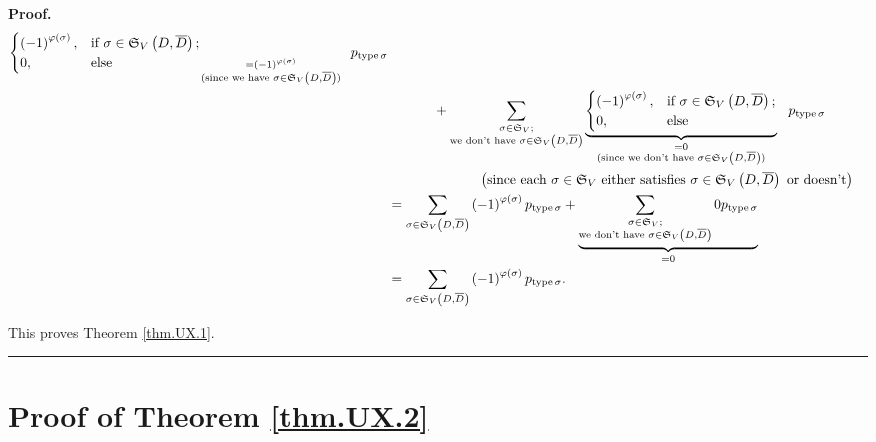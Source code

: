 \documentclass[numbers=enddot,12pt,final,onecolumn,notitlepage]{scrartcl}%
\numberwithin{exer}{section}
\theoremstyle{definition}
\newenvironment{proof}[1][Proof]{\noindent\textbf{#1.} }{\ \rule{0.5em}{0.5em}}
\let\sumnonlimits\sum
\renewcommand{\sum}{\sumnonlimits\limits}
\newenvironment{verlong}{}{}
\newenvironment{vershort}{}{}
\begin{document}
\begin{proof}
\begin{verlong}
\begin{align*}
{\begin{cases}
\left(  -1\right)  ^{\varphi\left(  \sigma\right)  }, & \text{if }\sigma
\in\mathfrak{S}_{V}\left(  D,\overline{D}\right)  ;\\
0, & \text{else}%
\end{cases}
}_{\substack{=\left(  -1\right)  ^{\varphi\left(  \sigma\right)
}\\\text{(since we have }\sigma\in\mathfrak{S}_{V}\left(  D,\overline
{D}\right)  \text{)}}}\ \ p_{\operatorname*{type}\sigma}\\
&  \ \ \ \ \ \ \ \ \ \ +\sum_{\substack{\sigma\in\mathfrak{S}_{V};\\\text{we
don't have }\sigma\in\mathfrak{S}_{V}\left(  D,\overline{D}\right)
}}\underbrace{%
\begin{cases}
\left(  -1\right)  ^{\varphi\left(  \sigma\right)  }, & \text{if }\sigma
\in\mathfrak{S}_{V}\left(  D,\overline{D}\right)  ;\\
0, & \text{else}%
\end{cases}
}_{\substack{=0\\\text{(since we don't have }\sigma\in\mathfrak{S}_{V}\left(
D,\overline{D}\right)  \text{)}}}\ \ p_{\operatorname*{type}\sigma}\\
&  \ \ \ \ \ \ \ \ \ \ \ \ \ \ \ \ \ \ \ \ \left(  \text{since each }\sigma
\in\mathfrak{S}_{V}\text{ either satisfies }\sigma\in\mathfrak{S}_{V}\left(
D,\overline{D}\right)  \text{ or doesn't}\right) \\
&  =\sum_{\sigma\in\mathfrak{S}_{V}\left(  D,\overline{D}\right)  }\left(
-1\right)  ^{\varphi\left(  \sigma\right)  }p_{\operatorname*{type}\sigma
}+\underbrace{\sum_{\substack{\sigma\in\mathfrak{S}_{V};\\\text{we don't have
}\sigma\in\mathfrak{S}_{V}\left(  D,\overline{D}\right)  }%
}0p_{\operatorname*{type}\sigma}}_{=0}\\
&  =\sum_{\sigma\in\mathfrak{S}_{V}\left(  D,\overline{D}\right)  }\left(
-1\right)  ^{\varphi\left(  \sigma\right)  }p_{\operatorname*{type}\sigma}.
\end{align*}

\end{verlong}

\begin{vershort}
\noindent This proves Theorem \ref{thm.UX.1}.
\end{vershort}
\end{proof}

\section{\label{sec.pf.thm.UX.2}Proof of Theorem \ref{thm.UX.2}}
\end{document}
